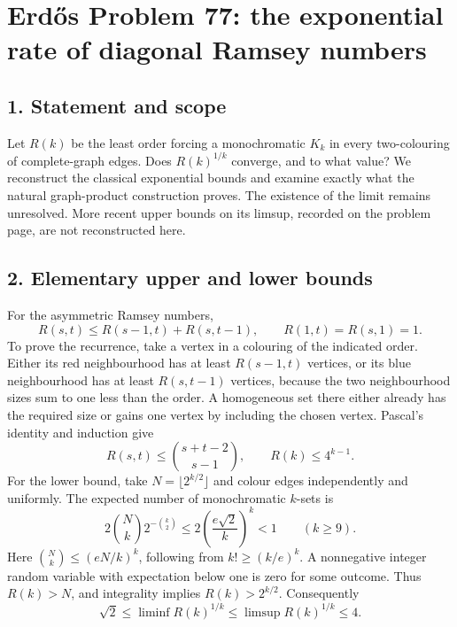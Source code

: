 \section*{Erd\H{o}s Problem 77: the exponential rate of diagonal Ramsey numbers}
\subsection*{1. Statement and scope}
Let $R(k)$ be the least order forcing a monochromatic $K_k$ in every two-colouring of complete-graph edges. Does $R(k)^{1/k}$ converge, and to what value? We reconstruct the classical exponential bounds and examine exactly what the natural graph-product construction proves. The existence of the limit remains unresolved. More recent upper bounds on its limsup, recorded on the problem page, are not reconstructed here.

\subsection*{2. Elementary upper and lower bounds}
For the asymmetric Ramsey numbers,
\[
 R(s,t)\le R(s-1,t)+R(s,t-1),\qquad R(1,t)=R(s,1)=1.
\]
To prove the recurrence, take a vertex in a colouring of the indicated order. Either its red neighbourhood has at least $R(s-1,t)$ vertices, or its blue neighbourhood has at least $R(s,t-1)$ vertices, because the two neighbourhood sizes sum to one less than the order. A homogeneous set there either already has the required size or gains one vertex by including the chosen vertex. Pascal's identity and induction give
\[
 R(s,t)\le\binom{s+t-2}{s-1},\qquad R(k)\le4^{k-1}.
\]
For the lower bound, take $N=\lfloor2^{k/2}\rfloor$ and colour edges independently and uniformly. The expected number of monochromatic $k$-sets is
\[
 2\binom Nk2^{-\binom k2}
 \le2\left(\frac{e\sqrt2}{k}\right)^k<1\qquad(k\ge9).
\]
Here $\binom Nk\le(eN/k)^k$, following from $k!\ge(k/e)^k$. A nonnegative integer random variable with expectation below one is zero for some outcome. Thus $R(k)>N$, and integrality implies $R(k)>2^{k/2}$. Consequently
\[
 \sqrt2\le\liminf R(k)^{1/k}\le\limsup R(k)^{1/k}\le4. \tag{1}
\]

